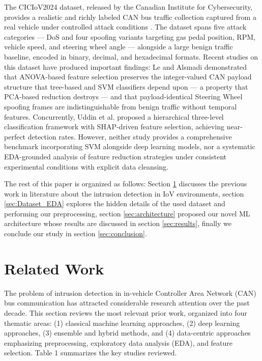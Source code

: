 \documentclass[conference]{IEEEtran}
\begin{document}
The CICIoV2024 dataset, released by the Canadian Institute for Cybersecurity, provides a realistic and richly labeled CAN bus traffic collection captured from a real vehicle under controlled attack conditions \cite{cic2024ciciov}. The dataset spans five attack categories — DoS and four spoofing variants targeting gas pedal position, RPM, vehicle speed, and steering wheel angle — alongside a large benign traffic baseline, encoded in binary, decimal, and hexadecimal formats. Recent studies on this dataset have produced important findings: Le and Alsmadi \cite{fi18010042} demonstrated that ANOVA-based feature selection preserves the integer-valued CAN payload structure that tree-based and SVM classifiers depend upon — a property that PCA-based reduction destroys — and that payload-identical Steering Wheel spoofing frames are indistinguishable from benign traffic without temporal features. Concurrently, Uddin et al. \cite{11098515} proposed a hierarchical three-level classification framework with SHAP-driven feature selection, achieving near-perfect detection rates. However, neither study provides a comprehensive benchmark incorporating SVM alongside deep learning models, nor a systematic EDA-grounded analysis of feature reduction strategies under consistent experimental conditions with explicit data cleansing.

The rest of this paper is organized as follows: Section \ref{sec:related_work} discusses the previous work in literature about the intrusion detection in IoV environments, section \ref{sec:Dataset_EDA} explores the hidden details of the used dataset and performing our preprocessing, section \ref{sec:architecture} proposed our novel ML architecture whose results are discussed in section \ref{sec:results}, finally we conclude our study in section \ref{sec:conclusion}.

\section{Related Work}
\label{sec:related_work}

The problem of intrusion detection in in-vehicle Controller Area Network (CAN) bus communication has attracted considerable research attention over the past decade. This section reviews the most relevant prior work, organized into four thematic areas: (1) classical machine learning approaches, (2) deep learning approaches, (3) ensemble and hybrid methods, and (4) data-centric approaches emphasizing preprocessing, exploratory data analysis (EDA), and feature selection. Table 1 summarizes the key studies reviewed.
\end{document}
